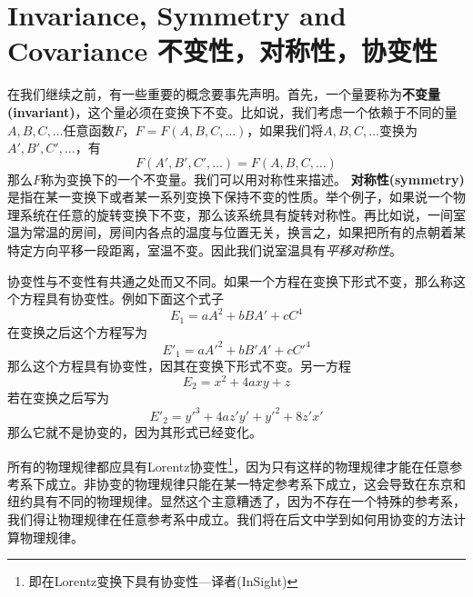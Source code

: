 \section[不变性，对称性，协变性]{Invariance, Symmetry and Covariance 不变性，对称性，协变性}
在我们继续之前，有一些重要的概念要事先声明。首先，一个量要称为{\bf{不变量(invariant)}}，这个量必须在变换下不变。比如说，我们考虑一个依赖于不同的量$A,B,C,\dots$任意函数$ F$，$F=F(A,B,C,\dots)$，如果我们将$A,B,C,\dots$变换为$A',B',C',\dots$，有
\begin{equation}\label{equ2.37}
  F(A',B',C',\dots)=F(A,B,C,\dots)
\end{equation}
那么$F$称为变换下的一个不变量。我们可以用对称性来描述。
{\bf{对称性(symmetry)}}是指在某一变换下或者某一系列变换下保持不变的性质。举个例子，如果说一个物理系统在任意的旋转变换下不变，那么该系统具有旋转对称性。再比如说，一间室温为常温的房间，房间内各点的温度与位置无关，换言之，如果把所有的点朝着某特定方向平移一段距离，室温不变。因此我们说室温具有{\it{平移对称性}}。

协变性与不变性有共通之处而又不同。如果一个方程在变换下形式不变，那么称这个方程具有协变性。例如下面这个式子
\[
E_1=a A^2+bBA'+cC^4
\]
在变换之后这个方程写为
\[
E'_1=a A'^2+bB'A'+cC'^4
\]
那么这个方程具有协变性，因其在变换下形式不变。另一方程
\[
E_2=x^2+4axy+z
\]
若在变换之后写为
\[
E'_2=y'^3+4az'y'+y'^2+8z'x'
\]
那么它就不是协变的，因为其形式已经变化。

所有的物理规律都应具有Lorentz协变性\footnote{即在Lorentz变换下具有协变性---译者(InSight)}，因为只有这样的物理规律才能在任意参考系下成立。非协变的物理规律只能在某一特定参考系下成立，这会导致在东京和纽约具有不同的物理规律。显然这个主意糟透了，因为不存在一个特殊的参考系，我们得让物理规律在任意参考系中成立。我们将在后文中学到如何用协变的方法计算物理规律。

